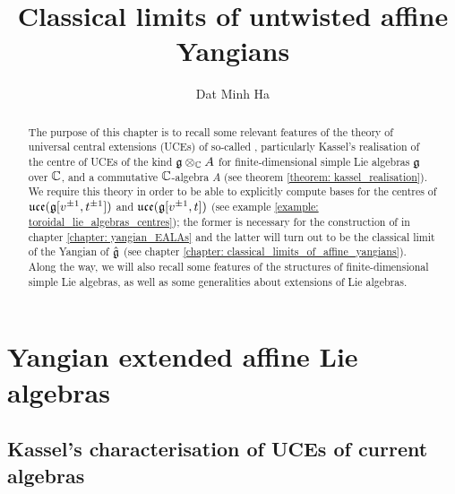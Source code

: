 

\setcounter{chapter}{-1}
\setcounter{section}{-1}


\newcommand{\toroidal}{\t}
\newcommand{\extendedtoroidal}{\hat{\t}}
\newcommand{\simpleroots}{\mathbb{I}}
\renewcommand{\positive}{+} 
\renewcommand{\negative}{-}



    \title{Classical limits of untwisted affine Yangians}
    
    \author{Dat Minh Ha}
    \maketitle
    
    {
      \hypersetup{} 
      \dominitoc
      \tableofcontents %
    }

    \newpage

    \listoftodos

    \newpage

    

    \newpage

    \part{Yangian extended affine Lie algebras}
        \chapter{Kassel's characterisation of UCEs of current algebras}
            \begin{abstract}
                The purpose of this chapter is to recall some relevant features of the theory of universal central extensions (UCEs) of so-called , particularly Kassel's realisation of the centre of UCEs of the kind $\g \tensor_{\bbC} A$ for finite-dimensional simple Lie algebras $\mathfrak{g}$ over $\mathbb{C}$, and a commutative $\mathbb{C}$-algebra $A$ (see theorem \ref{theorem: kassel_realisation}). We require this theory in order to be able to explicitly compute bases for the centres of $\mathfrak{uce}(\mathfrak{g}[v^{\pm 1}, t^{\pm 1}])$ and $\mathfrak{uce}(\mathfrak{g}[v^{\pm 1}, t])$ (see example \ref{example: toroidal_lie_algebras_centres}); the former is necessary for the construction of  in chapter \ref{chapter: yangian_EALAs} and the latter will turn out to be the classical limit of the Yangian of $\hat{\mathfrak{g}}$ (see chapter \ref{chapter: classical_limits_of_affine_yangians}). Along the way, we will also recall some features of the structures of finite-dimensional simple Lie algebras, as well as some generalities about extensions of Lie algebras.
            \end{abstract}
    
